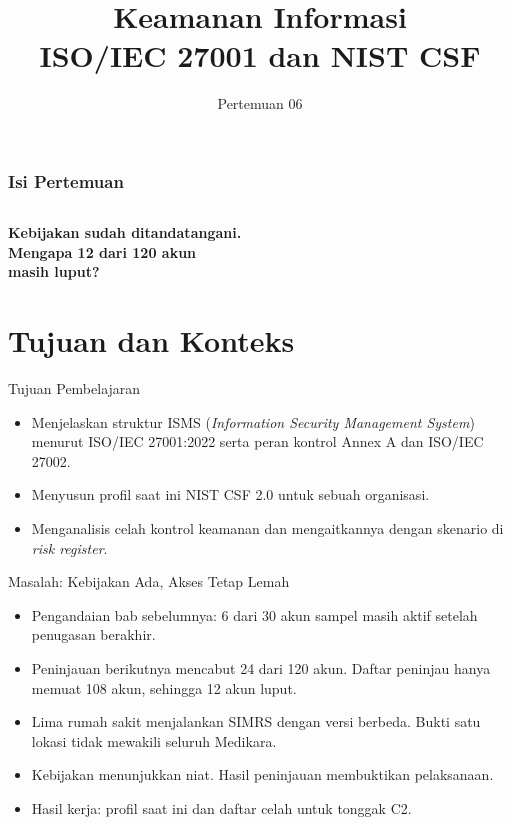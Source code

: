 \documentclass[aspectratio=169, table, 12pt]{beamer}
\title{\Huge Keamanan Informasi\\ \vspace{10pt} ISO/IEC 27001 dan NIST CSF}
\date{Pertemuan 06}
\begin{document}
\frame{\titlepage}

\begin{frame}
  \frametitle{Isi Pertemuan}
  \vspace{14pt}
  \begin{columns}[t]
    {\small\tableofcontents[sections={1-4}]}

    {\small\tableofcontents[sections={5-8}]}
  \end{columns}
\end{frame}

\begin{frame}{\hfill}
  \centering
  \Huge{\textbf{Kebijakan sudah ditandatangani.\\Mengapa 12 dari 120 akun\\masih luput?}}
\end{frame}

\section{Tujuan dan Konteks}

\begin{frame}{{\Large Tujuan Pembelajaran}}
  \vspace{10pt}
  \begin{itemize}
    \item Menjelaskan struktur ISMS (\textit{Information Security Management System}) menurut
          ISO/IEC 27001:2022 serta peran kontrol Annex A dan ISO/IEC 27002.
    \item Menyusun profil saat ini NIST CSF 2.0 untuk sebuah organisasi.
    \item Menganalisis celah kontrol keamanan dan mengaitkannya dengan skenario di \textit{risk
          register}.
  \end{itemize}
\end{frame}

\begin{frame}{{\Large Masalah: Kebijakan Ada, Akses Tetap Lemah}}
  \vspace{6pt}
  \small
  \begin{itemize}
    \item Pengandaian bab sebelumnya: 6 dari 30 akun sampel masih aktif setelah penugasan
          berakhir.
    \item Peninjauan berikutnya mencabut 24 dari 120 akun. Daftar peninjau hanya memuat 108 akun,
          sehingga 12 akun luput.
    \item Lima rumah sakit menjalankan SIMRS dengan versi berbeda. Bukti satu lokasi tidak mewakili
          seluruh Medikara.
    \item Kebijakan menunjukkan niat. Hasil peninjauan membuktikan pelaksanaan.
    \item Hasil kerja: profil saat ini dan daftar celah untuk tonggak C2.
  \end{itemize}
\end{frame}
\end{document}
